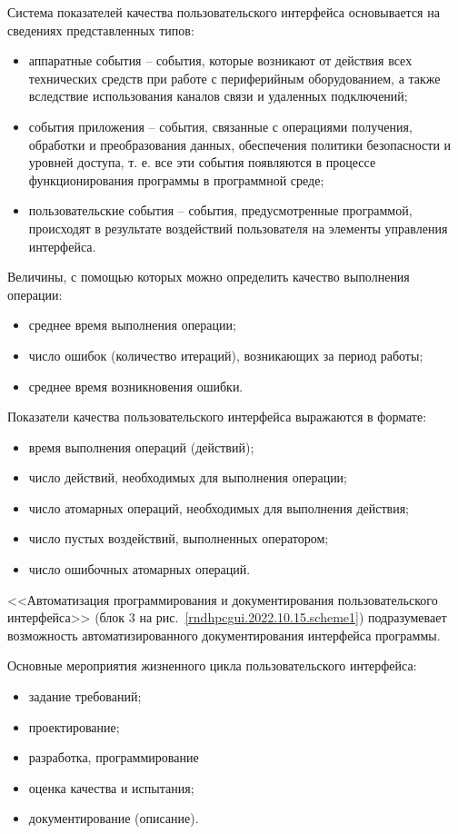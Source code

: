 	Система показателей качества пользовательского интерфейса основывается на сведениях представленных типов:
\begin{itemize}
	\item аппаратные события -- события, которые возникают от действия всех технических средств при работе с периферийным оборудованием, а также вследствие использования каналов связи и удаленных подключений;
	\item события приложения -- события, связанные с операциями получения, обработки и преобразования данных, обеспечения политики безопасности и уровней доступа, т. е. все эти события появляются в процессе функционирования программы в программной среде;
	\item пользовательские события -- события, предусмотренные программой, происходят в результате воздействий пользователя на элементы управления интерфейса.
\end{itemize}

Величины, с помощью которых можно определить качество выполнения операции:
\begin{itemize}
	\item среднее время выполнения операции; 
	\item число ошибок (количество итераций), возникающих за период работы;
	\item среднее время возникновения ошибки.
\end{itemize}

Показатели качества пользовательского интерфейса выражаются в формате: 
\begin{itemize}
	\item время выполнения операций (действий); 
	\item число действий, необходимых для выполнения операции; 
	\item число атомарных операций, необходимых для выполнения действия; 
	\item число пустых воздействий, выполненных оператором; 
	\item число ошибочных атомарных операций.
\end{itemize}

<<Автоматизация программирования и документирования пользовательского интерфейса>> (блок 3 на рис.~\ref{rndhpcgui.2022.10.15.scheme1}) подразумевает возможность автоматизированного документирования интерфейса программы.
	
Основные мероприятия жизненного цикла пользовательского интерфейса: 
\begin{itemize}
	\item задание требований; 
	\item проектирование; 
	\item разработка, программирование
	\item оценка качества и испытания; 
	\item документирование (описание).
\end{itemize}

